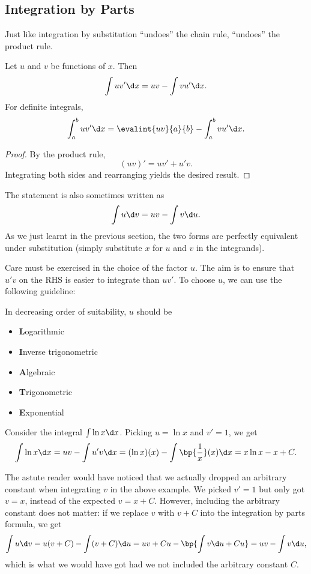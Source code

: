 \subsection{Integration by Parts}

Just like integration by substitution ``undoes'' the chain rule,  ``undoes'' the product rule.

\begin{proposition}
    Let $u$ and $v$ be functions of $x$. Then \[\int u v' \d x = uv - \int v u' \d x.\] For definite integrals, \[\int_a^b u v' \d x = \evalint{uv}{a}{b} - \int_a^b v u' \d x.\]
\end{proposition}
\begin{proof}
    By the product rule, \[(uv)' = uv' + u'v.\] Integrating both sides and rearranging yields the desired result.
\end{proof}

The statement is also sometimes written as \[\int u \d v = uv - \int v \d u.\] As we just learnt in the previous section, the two forms are perfectly equivalent under substitution (simply substitute $x$ for $u$ and $v$ in the integrands).

Care must be exercised in the choice of the factor $u$. The aim is to ensure that $u' v$ on the RHS is easier to integrate than $u v'$. To choose $u$, we can use the following guideline:

\begin{recipe}[LIATE]
    In decreasing order of suitability, $u$ should be
    \begin{itemize}
        \item \textbf{L}ogarithmic
        \item \textbf{I}nverse trigonometric
        \item \textbf{A}lgebraic
        \item \textbf{T}rigonometric
        \item \textbf{E}xponential
    \end{itemize}
\end{recipe}

\begin{example}
    Consider the integral $\int \ln x \d x$. Picking $u = \ln x$ and $v' = 1$, we get \[\int \ln x \d x = uv - \int u' v \d x = (\ln x)(x) - \int \bp{\frac1x} (x) \d x = x\ln x - x + C.\]
\end{example}

The astute reader would have noticed that we actually dropped an arbitrary constant when integrating $v$ in the above example. We picked $v' = 1$ but only got $v = x$, instead of the expected $v = x + C$. However, including the arbitrary constant does not matter: if we replace $v$ with $v + C$ into the integration by parts formula, we get \[\int u \d v = u(v + C) - \int (v + C) \d u = uv + Cu - \bp{\int v \d u + Cu} = uv - \int v \d u,\] which is what we would have got had we not included the arbitrary constant $C$.


